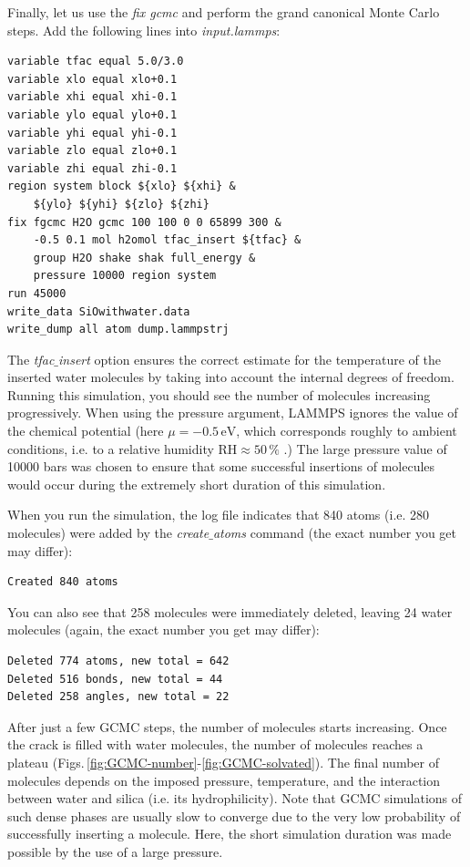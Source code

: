 \documentclass[9pt,tutorial]{livecoms}
\begin{document}
Finally, let us use the \textit{fix gcmc} and perform the grand canonical Monte Carlo steps. Add the following lines into \textit{input.lammps}:
{\normalsize \begin{verbatim}
variable tfac equal 5.0/3.0
variable xlo equal xlo+0.1
variable xhi equal xhi-0.1
variable ylo equal ylo+0.1
variable yhi equal yhi-0.1
variable zlo equal zlo+0.1
variable zhi equal zhi-0.1
region system block ${xlo} ${xhi} &
    ${ylo} ${yhi} ${zlo} ${zhi} 
fix fgcmc H2O gcmc 100 100 0 0 65899 300 &
    -0.5 0.1 mol h2omol tfac_insert ${tfac} &
    group H2O shake shak full_energy &
    pressure 10000 region system
run 45000
write_data SiOwithwater.data
write_dump all atom dump.lammpstrj
\end{verbatim}}
The \textit{tfac$\_$insert} option ensures the correct estimate for the temperature of the inserted water molecules by taking into account the internal degrees of freedom. Running this simulation, you should see the number of molecules increasing progressively. When using the pressure argument, LAMMPS ignores the value of the chemical potential (here $\mu = -0.5\,\text{eV}$, which corresponds roughly to ambient conditions, i.e. to a relative humidity $\text{RH} \approx 50\,\%$ \cite{gravelle2020multi}.) The large pressure value of 10000 bars was chosen to ensure that some successful insertions of molecules would occur during the extremely short duration of this simulation. 

When you run the simulation, the log file indicates that 840 atoms (i.e. 280 molecules) were added by the \textit{create$\_$atoms} command (the exact number you get may differ):
{\normalsize \begin{verbatim}
Created 840 atoms
\end{verbatim}}
You can also see that 258 molecules were immediately deleted, leaving 24 water molecules (again, the exact number you get may differ):
{\normalsize \begin{verbatim}
Deleted 774 atoms, new total = 642
Deleted 516 bonds, new total = 44
Deleted 258 angles, new total = 22
\end{verbatim}}
After just a few GCMC steps, the number of molecules starts increasing. Once the crack is filled with water molecules, the number of molecules reaches a plateau (Figs.\,\ref{fig:GCMC-number}-\ref{fig:GCMC-solvated}). The final number of molecules depends on the imposed pressure, temperature, and the interaction between water and silica (i.e. its hydrophilicity). Note that GCMC simulations of such dense phases are usually slow to converge due to the
very low probability of successfully inserting a molecule. Here, the short simulation duration was made possible by the use of a large pressure.
\end{document}

